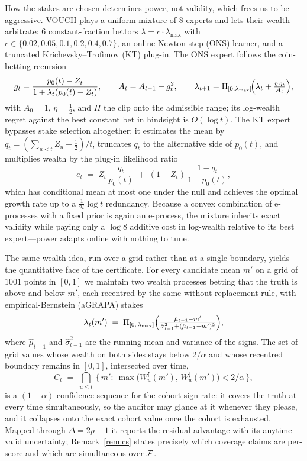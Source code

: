 How the stakes are chosen determines power, not validity, which frees us to be
aggressive. VOUCH plays a uniform mixture of $8$ experts and lets their wealth
arbitrate: $6$ constant-fraction bettors $\lambda = c \cdot \lambda_{\max}$ with
$c \in \{0.02, 0.05, 0.1, 0.2, 0.4, 0.7\}$, an online-Newton-step (ONS) learner, and a
truncated Krichevsky--Trofimov (KT) plug-in. The ONS expert follows the coin-betting
recursion
\begin{equation}\label{eq:ons}
g_t = \frac{p_0(t) - Z_t}{1 + \lambda_t (p_0(t) - Z_t)}, \qquad
A_t = A_{t-1} + g_t^2, \qquad
\lambda_{t+1} = \Pi_{[0,\lambda_{\max}]}\!\Bigl(\lambda_t + \tfrac{\eta\, g_t}{A_t}\Bigr),
\end{equation}
with $A_0 = 1$, $\eta = \tfrac12$, and $\Pi$ the clip onto the admissible range; its
log-wealth regret against the best constant bet in hindsight is $O(\log t)$. The KT
expert bypasses stake selection altogether: it estimates the mean by
$q_t = (\sum_{u<t} Z_u + \tfrac12)/t$, truncates $q_t$ to the alternative side of
$p_0(t)$, and multiplies wealth by the plug-in likelihood ratio
\begin{equation}\label{eq:kt}
e_t \;=\; Z_t\,\frac{q_t}{p_0(t)} \;+\; (1 - Z_t)\,\frac{1 - q_t}{1 - p_0(t)},
\end{equation}
which has conditional mean at most one under the null and achieves the optimal growth
rate up to a $\tfrac1{2t}\log t$ redundancy. Because a convex combination of
e-processes with a fixed prior is again an e-process, the mixture inherits exact
validity while paying only a $\log 8$ additive cost in log-wealth relative to its best
expert---power adapts online with nothing to tune.

The same wealth idea, run over a grid rather than at a single boundary, yields the
quantitative face of the certificate. For every candidate mean $m'$ on a grid of
$1001$ points in $[0,1]$ we maintain two wealth processes betting that the truth is
above and below $m'$, each recentred by the same without-replacement rule, with
empirical-Bernstein (aGRAPA) stakes
\begin{equation}\label{eq:agrapa}
\lambda_t(m') \;=\; \Pi_{[0,\,\lambda_{\max}]}
\Bigl(\tfrac{\hat\mu_{t-1} - m'}{\hat\sigma_{t-1}^2 + (\hat\mu_{t-1} - m')^2}\Bigr),
\end{equation}
where $\hat\mu_{t-1}$ and $\hat\sigma^2_{t-1}$ are the running mean and variance of the
signs. The set of grid values whose wealth on both sides stays below $2/\alpha$ and
whose recentred boundary remains in $[0,1]$, intersected over time,
\begin{equation}\label{eq:cs}
C_t \;=\; \bigcap_{u \le t}\,\bigl\{\, m' :\ \max\bigl(W_u^{\uparrow}(m'),\,
W_u^{\downarrow}(m')\bigr) < 2/\alpha \,\bigr\},
\end{equation}
is a $(1-\alpha)$ confidence sequence for the cohort sign rate: it covers the truth at
every time simultaneously, so the auditor may glance at it whenever they please, and
it collapses onto the exact cohort value once the cohort is exhausted. Mapped through
$\Delta = 2p - 1$ it reports the residual advantage with its anytime-valid
uncertainty; Remark~\ref{rem:cs} states precisely which coverage claims are per-score
and which are simultaneous over $\mathcal{F}$.

